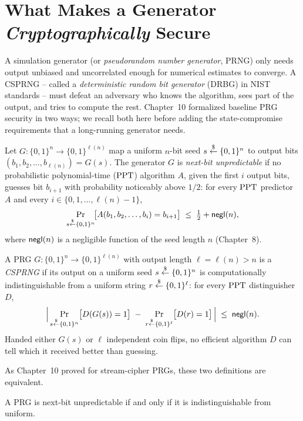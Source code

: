 \section{What Makes a Generator \emph{Cryptographically} Secure}
\label{ch17:csprng-def}

A simulation generator (or \emph{pseudorandom number generator}, PRNG) only needs output unbiased and uncorrelated enough for numerical estimates to converge. A CSPRNG -- called a \emph{deterministic random bit generator} (DRBG) in NIST standards -- must defeat an adversary who knows the algorithm, sees part of the output, and tries to compute the rest. Chapter~10 formalized baseline PRG security in two ways; we recall both here before adding the state-compromise requirements that a long-running generator needs.

\begin{definition}
\label{ch17:def-nextbit}
Let $G : \{0,1\}^n \to \{0,1\}^{\ell(n)}$ map a uniform $n$-bit seed $s \getsr \{0,1\}^n$ to output bits $(b_1, b_2, \dots, b_{\ell(n)}) = G(s)$. The generator $G$ is \emph{next-bit unpredictable} if no probabilistic polynomial-time ($\PPT$) algorithm $A$, given the first $i$ output bits, guesses bit $b_{i+1}$ with probability noticeably above $1/2$: for every $\PPT$ predictor $A$ and every $i \in \{0, 1, \dots, \ell(n)-1\}$,
\[
  \Pr_{s \getsr \{0,1\}^n}\!\bigl[A(b_1, b_2, \dots, b_i) = b_{i+1}\bigr] \;\le\; \tfrac12 + \negl(n),
\]
where $\negl(n)$ is a negligible function of the seed length $n$ (Chapter~8).
\end{definition}

\begin{definition}
\label{ch17:def-indist}
A PRG $G : \{0,1\}^n \to \{0,1\}^{\ell(n)}$ with output length $\ell = \ell(n) > n$ is a \emph{CSPRNG} if its output on a uniform seed $s \getsr \{0,1\}^n$ is computationally indistinguishable from a uniform string $r \getsr \{0,1\}^{\ell}$: for every $\PPT$ distinguisher $D$,
\[
  \abs[\Big]{\,\Pr_{s\getsr\{0,1\}^n}\!\big[D(G(s))=1\big] \;-\; \Pr_{r\getsr\{0,1\}^{\ell}}\!\big[D(r)=1\big]\,} \;\le\; \negl(n).
\]
Handed either $G(s)$ or $\ell$ independent coin flips, no efficient algorithm $D$ can tell which it received better than guessing.
\end{definition}

As Chapter~10 proved for stream-cipher PRGs, these two definitions are equivalent.

\begin{theorem}[Yao, 1982]
\label{ch17:thm-yao}
A PRG is next-bit unpredictable if and only if it is indistinguishable from uniform.
\end{theorem}

